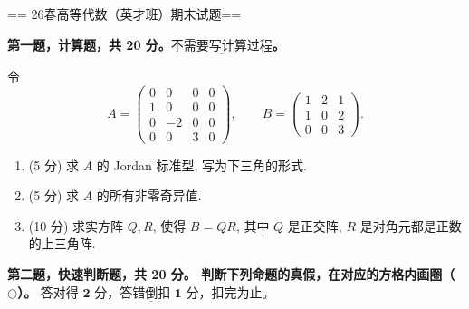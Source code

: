 


== 26春高等代数（英才班）期末试题==

\textbf{第一题，计算题，共 20 分。$\underline{不需要写计算过程}$。}

令
\[A =
\begin{pmatrix}
0 & 0 & 0 & 0 \\
1 & 0 & 0 & 0 \\
0 & -2 & 0 & 0 \\
0 & 0 & 3 & 0
\end{pmatrix},
\qquad
B =
\begin{pmatrix}
1 & 2 & 1 \\
1 & 0 & 2 \\
0 & 0 & 3
\end{pmatrix}.\]
\begin{enumerate}
\item (5 分) 求 $A$ 的 Jordan 标准型, 写为下三角的形式.
\item (5 分) 求 $A$ 的所有非零奇异值.
\item (10 分) 求实方阵 $Q,R$, 使得 $B=QR$, 
其中 $Q$ 是正交阵, $R$ 是对角元都是正数的上三角阵.
\end{enumerate}
\textbf{第二题，快速判断题，共 20 分。
判断下列命题的真假，在对应的方格内画圈（$\bigcirc$）。}
$\underline{\textbf{答对得 2 分，答错倒扣 1 分，扣完为止}}$。

